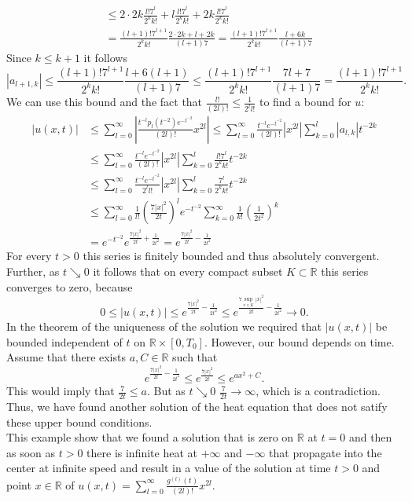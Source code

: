 \documentclass[A4,12pt,twoside]{book}
\begin{document}
{\begin{align*}
        & \leq 2 \cdot 2k \frac{l! 7^l}{2^{k} k!} + l \frac{l! 7^l}{2^{k} k!} + 2 k \frac{l! 7^l}{2^{k} k!} \\
        & = \frac{(l+1)! 7^{l+1}}{2^{k} k!} \frac{2 \cdot 2k + l  + 2 k }{(l+1) 7} = \frac{(l+1)! 7^{l+1}}{2^{k} k!} \frac{  l  + 6 k }{(l+1) 7} 
    \end{align*}
    Since $k \leq k+1$ it follows 
    \[
    |a_{l+1,k}| \leq \frac{(l+1)! 7^{l+1}}{2^{k} k!} \frac{  l  + 6 (l+1) }{(l+1) 7}  \leq \frac{(l+1)! 7^{l+1}}{2^{k} k!} \frac{  7l + 7 }{(l+1) 7} =  \frac{(l+1)! 7^{l+1}}{2^{k} k!} .
    \]
    We can use this bound and the fact that $\frac{l!}{(2l)!} \leq \frac{1}{2^l l!}$ to find a bound for $u$:
    \begin{align*}
        |u(x,t)| &\leq \sum_{l=0}^\infty \left| \frac{t^{-l} p_l (t^{-2}) e^{-t^{-2}} }{(2l)!} x^{2l} \right| \leq \sum_{l=0}^\infty  \frac{t^{-l}  e^{-t^{-2}} }{(2l)!} |x^{2l}|  \sum_{k=0}^l |a_{l,k} | t^{-2k} \\
        & \leq \sum_{l=0}^\infty  \frac{t^{-l}  e^{-t^{-2}} }{(2l)!} |x^{2l}|  \sum_{k=0}^l \frac{l!7^l}{2^k k!} t^{-2k} \\
        & \leq \sum_{l=0}^\infty  \frac{t^{-l}  e^{-t^{-2}} }{2^l l!} |x^{2l}|  \sum_{k=0}^l \frac{7^l}{2^k k!} t^{-2k} \\
        & \leq \sum_{l=0}^\infty \frac{1}{l!} \left( \frac{7|x|^2}{2t} \right)^l    e^{-t^{-2}}   \sum_{k=0}^\infty \frac{1}{k!}  \left( \frac{1}{2t^2} \right)^k \\
        & =  e^{-t^{-2}} e^{\frac{7|x|^2}{2t}+ \frac{1}{2t^2}} =  e^{\frac{7|x|^2}{2t}- \frac{1}{2t^2}}
    \end{align*}
    For every $t>0$ this series is finitely bounded and thus absolutely convergent. Further, as $t \searrow 0$ it follows that on every compact subset $K \subset \mathbb{R}$ this series converges to zero, because 
    \[
    0 \leq |u(x,t)| \leq e^{\frac{7|x|^2}{2t}- \frac{1}{2t^2}} \leq e^{\frac{7 \sup_{x \in K} |x|^2 }{2t} - \frac{1}{2t^2} } \to 0.
    \] 
    In the theorem of the uniqueness of the solution we required that $|u(x,t)|$ be bounded independent of $t$ on $\mathbb{R}\times [0,T_0]$. However, our bound depends on time. Assume that there exists $a,C \in \mathbb{R}$ such that 
    \[
    e^{\frac{7|x|^2}{2t}- \frac{1}{2t^2}}  \leq e^{\frac{7|x|^2}{2t}}  \leq e^{ax^2+C}.
    \]
    This would imply that $\frac{7}{2t} \leq a $. But as $t \searrow 0$ $\frac{7}{2t} \to \infty$, which is a contradiction. Thus, we have found another solution of the heat equation that does not satify these upper bound conditions.\\
    This example show that we found a solution that is zero on $\mathbb{R}$ at $t=0$ and then as soon as $t>0$ there is infinite heat at $+\infty$ and $-\infty$ that propagate into the center at infinite speed and result in a value of the solution at time $t>0$ and point $x \in \mathbb{R}$ of $u(x,t) = \sum_{l=0}^\infty \frac{g^{(l) } (t)}{(2l)!} x^{2l} $.
}
\end{document}

